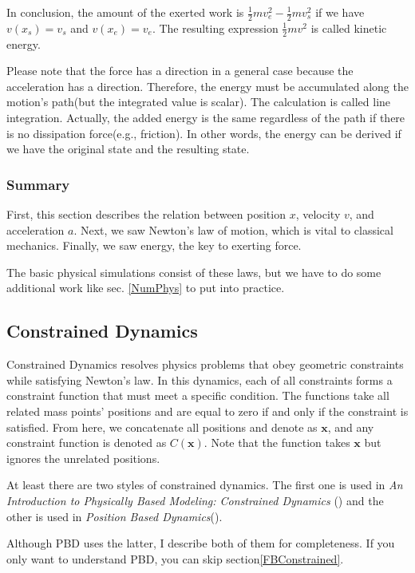 \documentclass[pdflatex,sn-mathphys-num]{sn-jnl}%
\theoremstyle{thmstyleone}%
\theoremstyle{thmstyletwo}%
\theoremstyle{thmstylethree}%
\begin{document}
In conclusion, the amount of the exerted work is $\frac{1}{2}m v_e^2-\frac{1}{2}mv_s^2$ if we have $v(x_s) = v_s$ and $v(x_e) = v_e$. The resulting expression $\frac{1}{2}m v^2$ is called kinetic energy.

Please note that the force has a direction in a general case because the acceleration has a direction. Therefore, the energy must be accumulated along the motion's path(but the integrated value is scalar). The calculation is called line integration. Actually, the added energy is the same regardless of the path if there is no dissipation force(e.g., friction). In other words, the energy can be derived if we have the original state and the resulting state.

\subsubsection{Summary}
First, this section describes the relation between position $x$, velocity $v$, and acceleration $a$. Next, we saw Newton's law of motion, which is vital to classical mechanics. Finally, we saw energy, the key to exerting force.

The basic physical simulations consist of these laws, but we have to do some additional work like sec. \ref{NumPhys} to put into practice.

\subsection{Constrained Dynamics}
Constrained Dynamics resolves physics problems that obey geometric constraints while satisfying Newton's law. In this dynamics, each of all constraints forms a constraint function that must meet a specific condition.
The functions take all related mass points' positions and are equal to zero if and only if the constraint is satisfied. From here, we concatenate all positions and denote as $\boldsymbol{x}$, and any constraint function is denoted as $C(\boldsymbol{x})$. Note that the function takes $\boldsymbol{x}$ but ignores the unrelated positions.

At least there are two styles of constrained dynamics. The first one is used in {\sl An Introduction to Physically Based Modeling: Constrained Dynamics} (\cite{ConstrainedWitkin}) and the other is used in {\sl Position Based Dynamics}(\cite{PBD}).

Although PBD uses the latter, I describe both of them for completeness. If you only want to understand PBD, you can skip section\ref{FBConstrained}.
\end{document}
